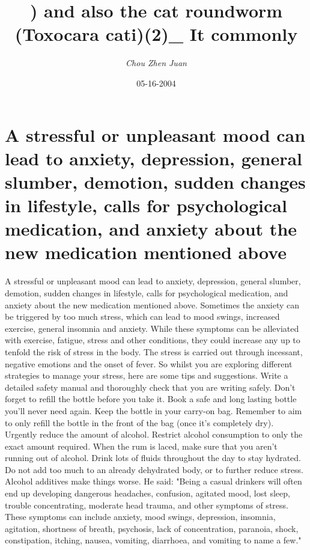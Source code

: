 \documentclass{article}%
\title{) and also the cat roundworm (Toxocara cati)(2)\_ It commonly}%
\author{\textit{Chou Zhen Juan}}%
\date{05-16-2004}%
\begin{document}
%
\normalsize%
\maketitle%
\section{A stressful or unpleasant mood can lead to anxiety, depression, general slumber, demotion, sudden changes in lifestyle, calls for psychological medication, and anxiety about the new medication mentioned above}%
\label{sec:Astressfulorunpleasantmoodcanleadtoanxiety,depression,generalslumber,demotion,suddenchangesinlifestyle,callsforpsychologicalmedication,andanxietyaboutthenewmedicationmentionedabove}%
A stressful or unpleasant mood can lead to anxiety, depression, general slumber, demotion, sudden changes in lifestyle, calls for psychological medication, and anxiety about the new medication mentioned above. Sometimes the anxiety can be triggered by too much stress, which can lead to mood swings, increased exercise, general insomnia and anxiety.\newline%
While these symptoms can be alleviated with exercise, fatigue, stress and other conditions, they could increase any up to tenfold the risk of stress in the body. The stress is carried out through incessant, negative emotions and the onset of fever.\newline%
So whilst you are exploring different strategies to manage your stress, here are some tips and suggestions.\newline%
Write a detailed safety manual and thoroughly check that you are writing safely. Don't forget to refill the bottle before you take it. Book a safe and long lasting bottle you'll never need again. Keep the bottle in your carry{-}on bag. Remember to aim to only refill the bottle in the front of the bag (once it's completely dry).\newline%
Urgently reduce the amount of alcohol. Restrict alcohol consumption to only the exact amount required. When the rum is laced, make sure that you aren't running out of alcohol. Drink lots of fluids throughout the day to stay hydrated. Do not add too much to an already dehydrated body, or to further reduce stress. Alcohol additives make things worse. He said: "Being a casual drinkers will often end up developing dangerous headaches, confusion, agitated mood, lost sleep, trouble concentrating, moderate head trauma, and other symptoms of stress. These symptoms can include anxiety, mood swings, depression, insomnia, agitation, shortness of breath, psychosis, lack of concentration, paranoia, shock, constipation, itching, nausea, vomiting, diarrhoea, and vomiting to name a few."\newline%
\end{document}
